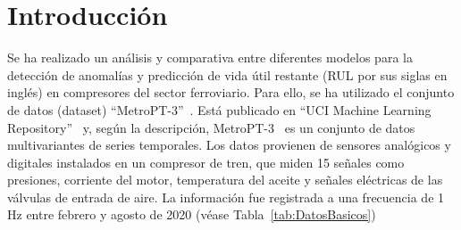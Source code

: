 \documentclass[12pt,letterpaper]{article}
\begin{document}
\hypertarget{Indice}{}
\tableofcontents
\newpage
\section{Introducción}
Se ha realizado un análisis y comparativa entre diferentes modelos para la detección de anomalías y predicción de vida útil restante (RUL por sus siglas en inglés)
en compresores del sector ferroviario. Para ello, se ha utilizado el conjunto de datos (dataset) ``MetroPT-3''~\cite{MetroPT-3}.
Está publicado en ``UCI Machine Learning Repository''~\cite{UCIMLR} y, según la descripción, MetroPT-3~\cite{MetroPT-3} es un conjunto de datos multivariantes de series temporales. Los datos provienen de sensores analógicos y digitales 
instalados en un compresor de tren, que miden 15 señales como presiones, corriente del motor, temperatura del aceite y señales eléctricas de las válvulas de entrada de aire. 
La información fue registrada a una frecuencia de 1 Hz entre febrero y agosto de 2020 (véase Tabla~\ref{tab:DatosBasicos})
\end{document}
